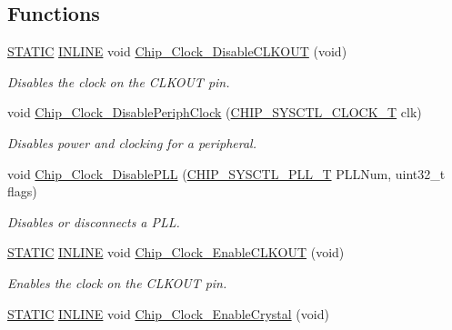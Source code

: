 \subsection*{Functions}
\begin{DoxyCompactItemize}
\item 
\hyperlink{group__LPC__Types__Public__Macros_ga10b2d890d871e1489bb02b7e70d9bdfb}{S\+T\+A\+T\+IC} \hyperlink{group__LPC__Types__Public__Types_ga2eb6f9e0395b47b8d5e3eeae4fe0c116}{I\+N\+L\+I\+NE} void \hyperlink{group__CLOCK__17XX__40XX_ga87c79d2ff63948102a6addd4222c4879}{Chip\+\_\+\+Clock\+\_\+\+Disable\+C\+L\+K\+O\+UT} (void)
\begin{DoxyCompactList}\small\item\em Disables the clock on the C\+L\+K\+O\+UT pin. \end{DoxyCompactList}\item 
void \hyperlink{group__CLOCK__17XX__40XX_ga1bcb3f29f3cfbe896517e7bb6ebeaf03}{Chip\+\_\+\+Clock\+\_\+\+Disable\+Periph\+Clock} (\hyperlink{group__CLOCK__17XX__40XX_ga82e75cbe777e79f448fec3987ddd978e}{C\+H\+I\+P\+\_\+\+S\+Y\+S\+C\+T\+L\+\_\+\+C\+L\+O\+C\+K\+\_\+T} clk)
\begin{DoxyCompactList}\small\item\em Disables power and clocking for a peripheral. \end{DoxyCompactList}\item 
void \hyperlink{group__CLOCK__17XX__40XX_ga3b9589b6a14d39653503be3693990f8f}{Chip\+\_\+\+Clock\+\_\+\+Disable\+P\+LL} (\hyperlink{group__SYSCTL__17XX__40XX_ga5f5478a201b021ed04a0724bff524c4b}{C\+H\+I\+P\+\_\+\+S\+Y\+S\+C\+T\+L\+\_\+\+P\+L\+L\+\_\+T} P\+L\+L\+Num, uint32\+\_\+t flags)
\begin{DoxyCompactList}\small\item\em Disables or disconnects a P\+LL. \end{DoxyCompactList}\item 
\hyperlink{group__LPC__Types__Public__Macros_ga10b2d890d871e1489bb02b7e70d9bdfb}{S\+T\+A\+T\+IC} \hyperlink{group__LPC__Types__Public__Types_ga2eb6f9e0395b47b8d5e3eeae4fe0c116}{I\+N\+L\+I\+NE} void \hyperlink{group__CLOCK__17XX__40XX_ga6b9661b89b2284e6f09af0e77303f9d2}{Chip\+\_\+\+Clock\+\_\+\+Enable\+C\+L\+K\+O\+UT} (void)
\begin{DoxyCompactList}\small\item\em Enables the clock on the C\+L\+K\+O\+UT pin. \end{DoxyCompactList}\item 
\hyperlink{group__LPC__Types__Public__Macros_ga10b2d890d871e1489bb02b7e70d9bdfb}{S\+T\+A\+T\+IC} \hyperlink{group__LPC__Types__Public__Types_ga2eb6f9e0395b47b8d5e3eeae4fe0c116}{I\+N\+L\+I\+NE} void \hyperlink{group__CLOCK__17XX__40XX_ga970e95c74fe056b7d846004c90a58012}{Chip\+\_\+\+Clock\+\_\+\+Enable\+Crystal} (void)

\end{DoxyCompactItemize}
